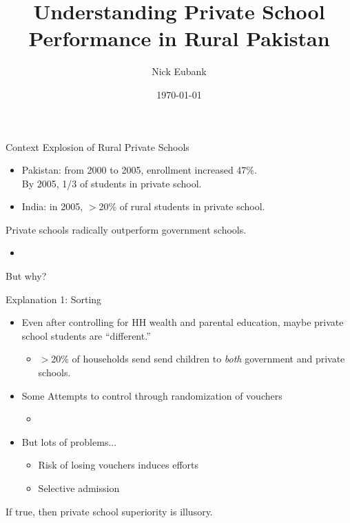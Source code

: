 \documentclass[handout]{beamer}
\title{Understanding Private School Performance in Rural Pakistan}
\author{Nick Eubank}
\date{\today}
\begin{document}
 

\begin{frame}{}
	\titlepage
\end{frame}

\begin{frame}{Context}
Explosion of Rural Private Schools
	\begin{itemize}
		\item Pakistan: from 2000 to 2005, enrollment increased 47\%. \\ 
			By 2005, 1/3 of students in private school.
		\item India: in 2005, $>$20\% of rural students in private school.
	\end{itemize}
\pause
Private schools radically outperform government schools.
	\begin{itemize}
		\item \citep{Jimenez:1991wa, Jimenez:1995vg, Pratham:2005vw, Andrabi:2011hl, Desai:2009ty, Tooley:2003vf, Alderman:2003we, Alderman:2001wk}
	\end{itemize}	
\pause
But why?
\end{frame}

\begin{frame}{Explanation 1: Sorting}
	\begin{itemize}
		\item Even after controlling for HH wealth and parental education, maybe private school students are ``different.''
		\pause
		\begin{itemize}
			\item $>$20\% of households send send children to \emph{both} government and private schools. 
		\end{itemize}
		\item Some Attempts to control through randomization of vouchers
			\begin{itemize}
				\item \citep{Angrist:2002up, Bellei:2008uu}
			\end{itemize}
		\item But lots of problems...
			\begin{itemize}
				\item Risk of losing vouchers induces efforts
				\item Selective admission
			\end{itemize}
	\end{itemize}	
\pause
If true, then private school superiority is illusory. 
\end{frame}
\end{document}
